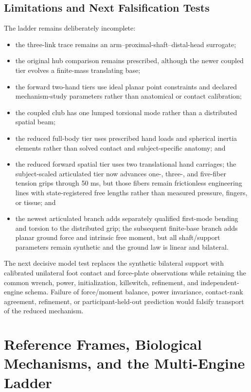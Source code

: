 \documentclass[
  letterpaper,
]{report}
\providecommand{\tightlist}{%
  \setlength{\itemsep}{0pt}\setlength{\parskip}{0pt}}
\begin{document}
\section{Limitations and Next Falsification
Tests}\label{sec-ladder-limitations}

The ladder remains deliberately incomplete:

\begin{itemize}
\tightlist
\item
  the three-link trace remains an arm--proximal-shaft--distal-head
  surrogate;
\item
  the original hub comparison remains prescribed, although the newer
  coupled tier evolves a finite-mass translating base;
\item
  the forward two-hand tiers use ideal planar point constraints and
  declared mechanism-study parameters rather than anatomical or contact
  calibration;
\item
  the coupled club has one lumped torsional mode rather than a
  distributed spatial beam;
\item
  the reduced full-body tier uses prescribed hand loads and spherical
  inertia elements rather than solved contact and subject-specific
  anatomy; and
\item
  the reduced forward spatial tier uses two translational hand
  carriages; the subject-scaled articulated tier now advances one-,
  three-, and five-fiber tension grips through 50 ms, but those fibers
  remain frictionless engineering lines with state-registered free
  lengths rather than measured pressure, fingers, or tissue; and
\item
  the newest articulated branch adds separately qualified first-mode
  bending and torsion to the distributed grip; the subsequent
  finite-base branch adds planar ground force and intrinsic free moment,
  but all shaft/support parameters remain synthetic and the ground law
  is linear and bilateral.
\end{itemize}

The next decisive model test replaces the synthetic bilateral support
with calibrated unilateral foot contact and force-plate observations
while retaining the common wrench, power, initialization, killswitch,
refinement, and independent-engine schema. Failure of force/moment
balance, power invariance, contact-rank agreement, refinement, or
participant-held-out prediction would falsify transport of the reduced
mechanism.

\chapter{Reference Frames, Biological Mechanisms, and the Multi-Engine
Ladder}\label{sec-frames-biology-engines}
\end{document}
